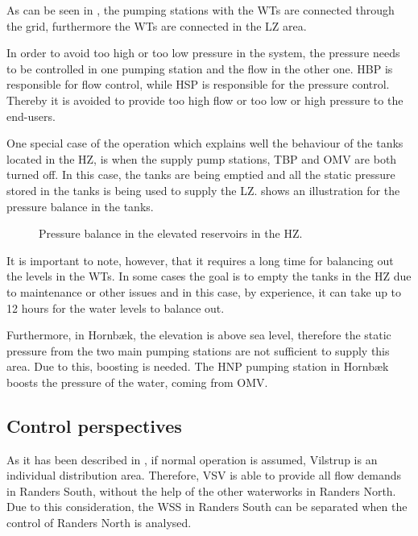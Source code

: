 \vspace{-3mm}

As can be seen in , the pumping stations with the WTs are connected through the grid, furthermore the WTs are connected in the LZ area.

In order to avoid too high or too low pressure in the system, the pressure needs to be controlled in one pumping station and the flow in the other one. HBP is responsible for flow control, while HSP is responsible for the pressure control. Thereby it is avoided to provide too high flow or too low or high pressure to the end-users. 

One special case of the operation which explains well the behaviour of the tanks located in the HZ, is when the supply pump stations, TBP and OMV are both turned off. In this case, the tanks are being emptied and all the static pressure stored in the tanks is being used to supply the LZ.  shows an illustration for the pressure balance in the tanks.

\begin{figure}[H]
\centering

\caption{Pressure balance in the elevated reservoirs in the HZ. }
\label{fig:pressure_balance_Randers}
\end{figure}

\vspace{-3mm}
It is important to note, however, that it requires a long time for balancing out the levels in the WTs. In some cases the goal is to empty the tanks in the HZ due to maintenance or other issues and in this case, by experience, it can take up to 12 hours for the water levels to balance out.  

Furthermore, in Hornbæk, the elevation is above sea level, therefore the static pressure from the two main pumping stations are not sufficient to supply this area. Due to this, boosting is needed. The HNP pumping station in Hornbæk boosts the pressure of the water, coming from OMV. 

\subsection{Control perspectives}
\label{Randers_wss_summary}

As it has been described in , if normal operation is assumed, Vilstrup is an individual distribution area. Therefore, VSV is able to provide all flow demands in Randers South, without the help of the other waterworks in Randers North. Due to this consideration, the WSS in Randers South can be separated when the control of Randers North is analysed. 


